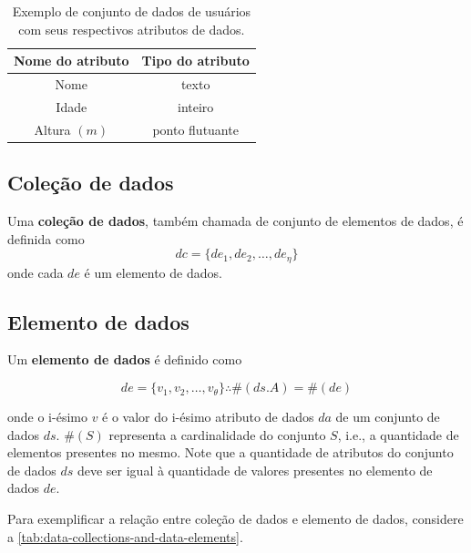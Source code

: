 \begin{table}[htb]
    \centering
    \begin{tabular}{|c|c|}
        \hline
        \textbf{Nome do atributo} & \textbf{Tipo do atributo} \\
        \hline
        Nome             & texto           \\
        \hline
        Idade            & inteiro         \\
        \hline
        Altura \( (m) \) & ponto flutuante \\
        \hline
    \end{tabular}
    \caption[Exemplo de conjunto de dados com seus atributos de dados]{Exemplo de conjunto de dados de usuários com seus respectivos atributos de dados.}%
    \label{tab:dataset-attributes-example}
\end{table}

\subsection{Coleção de dados}

Uma \textbf{coleção de dados}, também chamada de conjunto de elementos de dados, é definida como \[ dc = \{ de_1, de_2, \ldots, de_{\eta} \} \] onde cada \( de \) é um elemento de dados.

\subsection{Elemento de dados}

Um \textbf{elemento de dados} é definido como

\[ de = \{ v_1, v_2, \ldots, v_{\theta} \} \therefore \#(ds.A) = \#(de) \]

onde o i-ésimo \( v \) é o valor do i-ésimo atributo de dados \( da \) de um conjunto de dados \( ds \). \( \#(S) \) representa a cardinalidade do conjunto \( S \), i.e., a quantidade de elementos presentes no mesmo. Note que a quantidade de atributos do conjunto de dados \( ds \) deve ser igual à quantidade de valores presentes no elemento de dados \( de \).

Para exemplificar a relação entre coleção de dados e elemento de dados, considere a \autoref{tab:data-collections-and-data-elements}.


